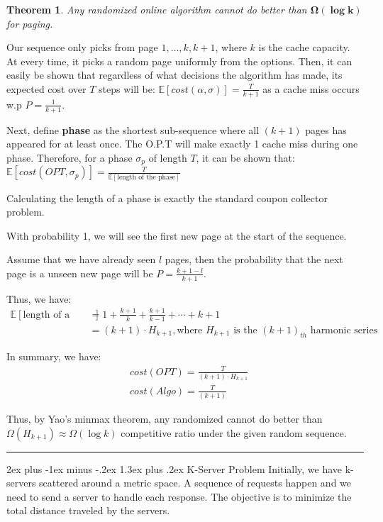 \documentclass[11pt]{article}
\makeatletter
\renewcommand{\section}{\@startsection{section}{1}{0mm}%
                                 {2ex plus -1ex minus -.2ex}%
                                 {1.3ex plus .2ex}%
                                 {\normalfont\Large\bfseries}}%
\newenvironment{proof}{{\bf Proof:  }}{\hfill\rule{2mm}{2mm}}
\newtheorem{theorem}[fact]{Theorem}
\makeatother
\begin{document}
\begin{theorem}
    Any randomized online algorithm cannot do better than $\boldsymbol{\Omega(\log k)}$ for paging.
\end{theorem}
\begin{proof}
Our sequence only picks from page $1, \dots, k, k+1$, where $k$ is the cache capacity. At every time, it picks a random page uniformly from the options. Then, it can easily be shown that regardless of what decisions the algorithm has made, its expected cost over $T$ steps will be: $\mathbb{E}\left[cost(\alpha, \sigma)\right] = \frac{T}{k+1}$ as a cache miss occurs w.p $P = \frac{1}{k+1}$.

Next, define \textbf{phase} as the shortest sub-sequence where all $(k+1)$ pages has appeared for at least once. The O.P.T will make exactly 1 cache miss during one phase. Therefore, for a phase $\sigma_p$ of length $T$, it can be shown that:
$\mathbb{E}\left[cost(OPT, \sigma_p)\right] = \frac{T}{\mathbb{E}\left[\text{length of the phase}\right]}$

Calculating the length of a phase is exactly the standard coupon collector problem.

With probability 1, we will see the first new page at the start of the sequence.

Assume that we have already seen $l$ pages, then the probability that the next page is a unseen new page will be $P = \frac{k+1-l}{k+1}$.

Thus, we have:
\begin{align*}
\mathbb{E}\left[\text{length of a phase}\right] &= 1 + \frac{k+1}{k} + \frac{k+1}{k-1} + \cdots  + k+1\\
&= (k+1) \cdot H_{k+1}, \text{where $H_{k+1}$ is the $(k+1)_{th}$ harmonic series}    
\end{align*}

In summary, we have:
\begin{align*}
    &cost(OPT) = \frac{T}{(k+1) \cdot H_{k+1}}\\
    &cost(Algo) = \frac{T}{(k+1)}
\end{align*}

Thus, by Yao's minmax theorem, any randomized cannot do better than $\Omega(H_{k+1}) \approx \Omega(\log k)$ competitive ratio under the given random sequence. 
\end{proof}

\section{K-Server Problem}
Initially, we have k-servers scattered around a metric space. A sequence of requests happen and we need to send a server to handle each response. The objective is to minimize the total distance traveled by the servers.
\end{document}
